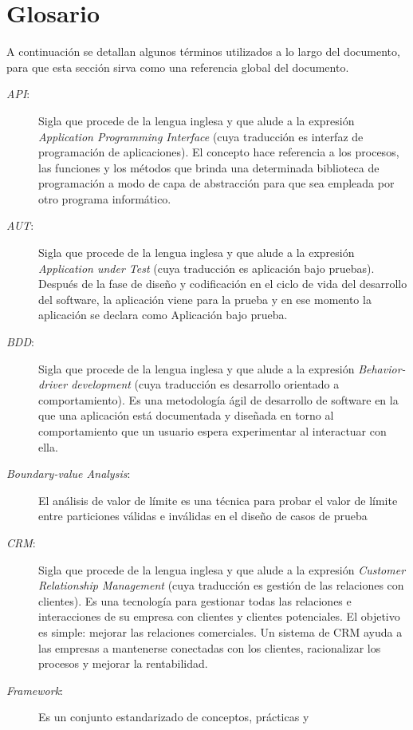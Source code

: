 \chapter{Glosario}\label{appendix_glossary}
A continuación se detallan algunos términos utilizados a lo largo del
documento, para que esta sección sirva como una referencia global del documento.

\begin{description}
\item [\emph{API}:] Sigla que procede de la lengua inglesa y que alude a la
    expresión \emph{Application Programming Interface} (cuya traducción es
    interfaz de programación de aplicaciones). El concepto hace referencia a los
    procesos, las funciones y los métodos que brinda una determinada biblioteca
    de programación a modo de capa de abstracción para que sea empleada por otro
    programa informático.
\item [\emph{AUT}:] Sigla que procede de la lengua inglesa y que alude a la
    expresión \emph{Application under Test} (cuya traducción es aplicación bajo
    pruebas). Después de la fase de diseño y codificación en el ciclo de vida
    del desarrollo del software, la aplicación viene para la prueba y en ese
    momento la aplicación se declara como Aplicación bajo prueba.
\item [\emph{BDD}:] Sigla que procede de la lengua inglesa y que alude a la
    expresión \emph{Behavior-driver development} (cuya traducción es desarrollo
    orientado a comportamiento). Es una metodología ágil de desarrollo de
    software en la que una aplicación está documentada y diseñada en torno al
    comportamiento que un usuario espera experimentar al interactuar con ella.
\item [\emph{Boundary-value Analysis}:] El análisis de valor de límite es una
    técnica para probar el valor de límite entre particiones válidas e inválidas
    en el diseño de casos de prueba
\item [\emph{CRM}:] Sigla que procede de la lengua inglesa y que alude a la
    expresión \emph{Customer Relationship Management} (cuya traducción es
    gestión de las relaciones con clientes). Es una tecnología para gestionar
    todas las relaciones e interacciones de su empresa con clientes y clientes
    potenciales. El objetivo es simple: mejorar las relaciones comerciales. Un
    sistema de CRM ayuda a las empresas a mantenerse conectadas con los
    clientes, racionalizar los procesos y mejorar la rentabilidad.
\item [\emph{Framework}:] Es un conjunto estandarizado de conceptos, prácticas y

\end{description}
